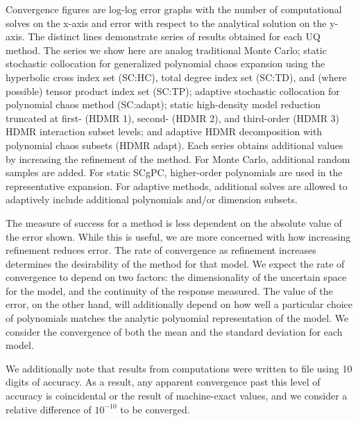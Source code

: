 Convergence figures are
log-log error graphs with the number of computational solves on the x-axis and error with respect to the analytical
solution on the y-axis.  The distinct lines demonstrate series of results obtained for each UQ method.  
The series we show here are analog traditional Monte Carlo; static 
stochastic collocation for generalized polynomial chaos expansion using the hyperbolic
cross index set (SC:HC), total degree index set (SC:TD), and (where possible) tensor product index set (SC:TP);
adaptive stochastic collocation for polynomial chaos method (SC:adapt); 
static high-density model reduction truncated at first- (HDMR 1), second- (HDMR 2), and third-order (HDMR 3)
HDMR interaction subset levels;
and adaptive HDMR decomposition with polynomial chaos subsets (HDMR adapt).
Each
series obtains additional values by increasing the refinement of the method.  For Monte Carlo, additional
random samples are added.  For static SCgPC, higher-order polynomials are used in the representative expansion.  For
adaptive methods, additional solves are allowed to adaptively include additional polynomials and/or dimension
subsets.

The measure of success for a method is less dependent on the absolute value of the error shown.  While this is
useful, we are more concerned with how increasing refinement reduces error.  The
rate of convergence as refinement increases determines the desirability of the method for that model.  We
expect the rate of convergence to depend on two factors: the dimensionality of the uncertain space for the
model, and the continuity of the response measured.  The value of the error, on the other hand, will additionally
depend on how well a particular choice of polynomials matches the analytic polynomial representation of the model.
We consider the convergence of both the mean and the standard deviation for each model.

We additionally note that results from \raven{} computations were written to file using 10 digits of accuracy.
As a result, any apparent convergence past this level of accuracy is coincidental or the result of
machine-exact values, and we consider a relative difference of $10^{-10}$ to be converged.

